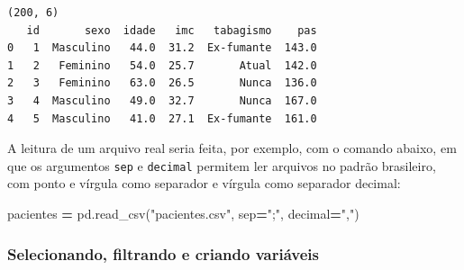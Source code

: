 \documentclass[
]{book}
\newenvironment{Shaded}{\begin{snugshade}}{\end{snugshade}}
\newcommand{\NormalTok}[1]{#1}
\newcommand{\OperatorTok}[1]{\textcolor[rgb]{0.81,0.36,0.00}{\textbf{#1}}}
\newcommand{\StringTok}[1]{\textcolor[rgb]{0.31,0.60,0.02}{#1}}
\begin{document}
\begin{verbatim}
(200, 6)
   id       sexo  idade   imc   tabagismo    pas
0   1  Masculino   44.0  31.2  Ex-fumante  143.0
1   2   Feminino   54.0  25.7       Atual  142.0
2   3   Feminino   63.0  26.5       Nunca  136.0
3   4  Masculino   49.0  32.7       Nunca  167.0
4   5  Masculino   41.0  27.1  Ex-fumante  161.0
\end{verbatim}

A leitura de um arquivo real seria feita, por exemplo, com o comando abaixo, em que os argumentos \texttt{sep} e \texttt{decimal} permitem ler arquivos no padrão brasileiro, com ponto e vírgula como separador e vírgula como separador decimal:

\begin{Shaded}
\begin{Highlighting}[]
\NormalTok{pacientes }\OperatorTok{=}\NormalTok{ pd.read\_csv(}\StringTok{"pacientes.csv"}\NormalTok{, sep}\OperatorTok{=}\StringTok{";"}\NormalTok{, decimal}\OperatorTok{=}\StringTok{","}\NormalTok{)}
\end{Highlighting}
\end{Shaded}

\subsubsection{Selecionando, filtrando e criando variáveis}\label{selecionando-filtrando-e-criando-variuxe1veis}
\end{document}
